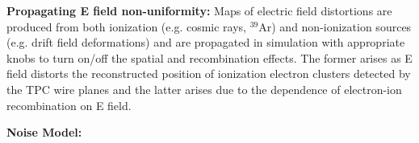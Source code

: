 \textbf{Propagating E field non-uniformity:} 
Maps of electric field distortions are produced from both ionization (e.g. cosmic rays, ${}^{39}$Ar) and non-ionization sources (e.g. drift field deformations) and are propagated in simulation with appropriate knobs to turn on\slash off the spatial and recombination effects. The former arises as E field distorts the reconstructed position of ionization electron clusters detected by the TPC wire planes and the latter arises due to the dependence of electron-ion recombination on E field.

\textbf{Noise Model:} 




